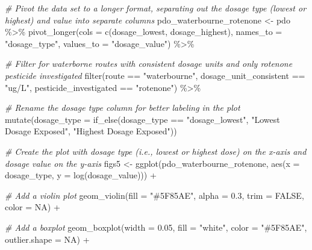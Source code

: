\documentclass[
]{article}
\newenvironment{Shaded}{\begin{snugshade}}{\end{snugshade}}
\newcommand{\AttributeTok}[1]{\textcolor[rgb]{0.77,0.63,0.00}{#1}}
\newcommand{\CommentTok}[1]{\textcolor[rgb]{0.56,0.35,0.01}{\textit{#1}}}
\newcommand{\ConstantTok}[1]{\textcolor[rgb]{0.00,0.00,0.00}{#1}}
\newcommand{\FloatTok}[1]{\textcolor[rgb]{0.00,0.00,0.81}{#1}}
\newcommand{\FunctionTok}[1]{\textcolor[rgb]{0.00,0.00,0.00}{#1}}
\newcommand{\NormalTok}[1]{#1}
\newcommand{\OtherTok}[1]{\textcolor[rgb]{0.56,0.35,0.01}{#1}}
\newcommand{\SpecialCharTok}[1]{\textcolor[rgb]{0.00,0.00,0.00}{#1}}
\newcommand{\StringTok}[1]{\textcolor[rgb]{0.31,0.60,0.02}{#1}}
\begin{document}
\begin{Shaded}
\begin{Highlighting}[]
\CommentTok{\# Pivot the data set to a longer format, separating out the dosage type (lowest or highest) and value into separate columns}
\NormalTok{pdo\_waterbourne\_rotenone }\OtherTok{\textless{}{-}}\NormalTok{ pdo }\SpecialCharTok{\%\textgreater{}\%}
  \FunctionTok{pivot\_longer}\NormalTok{(}\AttributeTok{cols =} \FunctionTok{c}\NormalTok{(dosage\_lowest, dosage\_highest), }
               \AttributeTok{names\_to =} \StringTok{"dosage\_type"}\NormalTok{,}
               \AttributeTok{values\_to =} \StringTok{"dosage\_value"}\NormalTok{) }\SpecialCharTok{\%\textgreater{}\%} 
  
  \CommentTok{\# Filter for waterborne routes with consistent dosage units and only rotenone pesticide investigated}
  \FunctionTok{filter}\NormalTok{(route }\SpecialCharTok{==} \StringTok{"waterbourne"}\NormalTok{, dosage\_unit\_consistent }\SpecialCharTok{==} \StringTok{"ug/L"}\NormalTok{, pesticide\_investigated }\SpecialCharTok{==} \StringTok{"rotenone"}\NormalTok{) }\SpecialCharTok{\%\textgreater{}\%} 
  
  \CommentTok{\# Rename the dosage type column for better labeling in the plot}
  \FunctionTok{mutate}\NormalTok{(}\AttributeTok{dosage\_type =} \FunctionTok{if\_else}\NormalTok{(dosage\_type }\SpecialCharTok{==} \StringTok{"dosage\_lowest"}\NormalTok{, }\StringTok{"Lowest Dosage Exposed"}\NormalTok{, }\StringTok{"Highest Dosage Exposed"}\NormalTok{))}

\CommentTok{\# Create the plot with dosage type (i.e., lowest or highest dose) on the x{-}axis and dosage value on the y{-}axis}
\NormalTok{figs5 }\OtherTok{\textless{}{-}} \FunctionTok{ggplot}\NormalTok{(pdo\_waterbourne\_rotenone, }\FunctionTok{aes}\NormalTok{(}\AttributeTok{x =}\NormalTok{ dosage\_type, }\AttributeTok{y =} \FunctionTok{log}\NormalTok{(dosage\_value))) }\SpecialCharTok{+}
  
  \CommentTok{\# Add a violin plot }
  \FunctionTok{geom\_violin}\NormalTok{(}\AttributeTok{fill =} \StringTok{"\#5F85AE"}\NormalTok{, }\AttributeTok{alpha =} \FloatTok{0.3}\NormalTok{, }\AttributeTok{trim =} \ConstantTok{FALSE}\NormalTok{, }\AttributeTok{color =} \ConstantTok{NA}\NormalTok{) }\SpecialCharTok{+}
  
  \CommentTok{\# Add a boxplot }
  \FunctionTok{geom\_boxplot}\NormalTok{(}\AttributeTok{width =} \FloatTok{0.05}\NormalTok{, }\AttributeTok{fill =} \StringTok{"white"}\NormalTok{, }\AttributeTok{color =} \StringTok{"\#5F85AE"}\NormalTok{, }\AttributeTok{outlier.shape =} \ConstantTok{NA}\NormalTok{) }\SpecialCharTok{+}
  

\end{Highlighting}
\end{Shaded}
\end{document}
